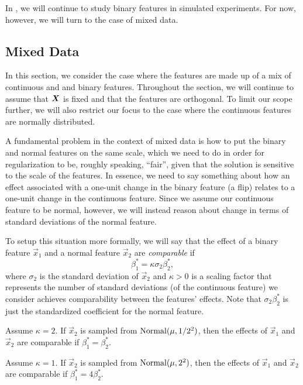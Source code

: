 In , we will continue to study binary features in simulated experiments. For now, however, we will turn to the case of mixed data.

\subsection{Mixed Data}\label{sec:mixed-data}

In this section, we consider the case where the features are made up of a mix of continuous and and binary features.
Throughout the section, we will continue to assume that \(\boldsymbol{X}\) is fixed and that the features are orthogonal.
To limit our scope further, we will also restrict our focus to the case where the continuous features are normally distributed.

A fundamental problem in the context of mixed data is how to put the binary and normal features on the same scale, which we need to do in order for regularization to be, roughly speaking, ``fair'', given that the solution is sensitive to the scale of the features.
In essence, we need to say something about how an effect associated with a one-unit change in the binary feature (a flip) relates to a one-unit change in the continuous feature.
Since we assume our continuous feature to be normal, however, we will instead reason about change in terms of standard deviations of the normal feature.

To setup this situation more formally, we will say that the effect of a binary feature \(\vec{x}_1\) and a normal feature \(\vec{x}_2\) are \emph{comparable} if
\[
  \beta^*_1 = \kappa \sigma_{2}\beta^*_2,
\]
where \(\sigma_2\) is the standard deviation of \(\vec{x}_2\) and \(\kappa > 0\) is a scaling factor that represents the number of standard deviations (of the continuous feature) we consider achieves comparability between the features' effects. Note that \(\sigma_2 \beta_2^*\) is just the standardized coefficient for the normal feature.

\begin{example}
  Assume \(\kappa = 2\). If \(\vec{x}_2\) is sampled from \(\operatorname{Normal}(\mu, 1/2^2)\), then the effects of \(\vec{x}_1\) and \(\vec{x}_2\) are comparable if \(\beta_1^* = \beta_2^*\).
\end{example}
\begin{example}
  Assume \(\kappa = 1\). If \(\vec{x}_2\) is sampled from \(\operatorname{Normal}(\mu, 2^2)\), then the effects of \(\vec{x}_1\) and \(\vec{x}_2\) are comparable if \(\beta_1^* = 4\beta_2^*\).
\end{example}

